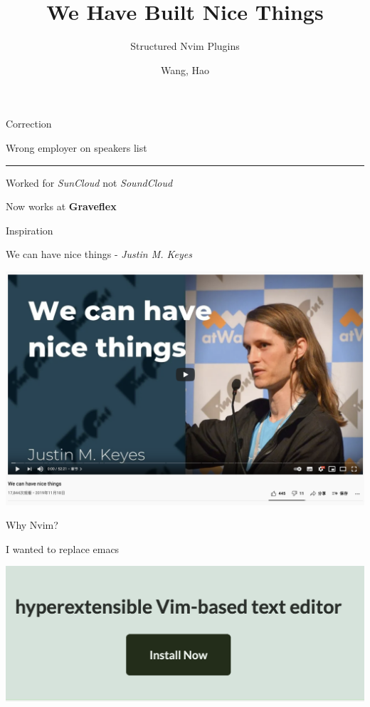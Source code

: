 \documentclass{beamer}
\title{We Have Built Nice Things}
\subtitle{Structured Nvim Plugins}
\author{Wang, Hao}
\institute{Lead Engineer @ Graveflex | ms-jpq @ github | hola@bigly.dog}
\date{}
\begin{document}
\begin{frame}

	\titlepage

\end{frame}


\begin{frame}{Correction}

	Wrong employer on speakers list

	\rule{\textwidth}{0.1em}

	Worked for \textit{SunCloud} not \textit{SoundCloud}

	\hspace{0.1em}

	Now works at \textbf{Graveflex}

\end{frame}


\begin{frame}{Inspiration}

	We can have nice things - \textit{Justin M. Keyes}

	\vspace{1em}

	\includegraphics[width=\textwidth]{we_can_have_nice}

\end{frame}


\begin{frame}{Why Nvim?}

	I wanted to replace emacs

	\vspace{1em}

	\includegraphics[width=\textwidth]{home_page}

	\vspace{1em}

\end{frame}
\end{document}
